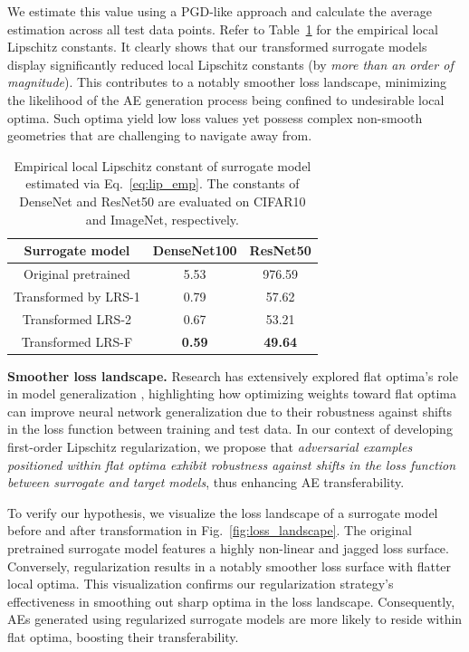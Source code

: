 \documentclass[letterpaper]{article} %
\theoremstyle{plain}
\theoremstyle{definition}
\newcommand{\fref}[1]{Fig.~\ref{#1}}
\newcommand{\tref}[1]{Table~\ref{#1}}
\begin{document}
We estimate this value using a PGD-like approach and calculate the average estimation across all test data points. Refer to \tref{tab:lip_const} for the empirical local Lipschitz constants. It clearly shows that our transformed surrogate models display significantly reduced local Lipschitz constants (by {\em more than an order of magnitude}). This contributes to a notably smoother loss landscape, minimizing the likelihood of the AE generation process being confined to undesirable local optima. Such optima yield low loss values yet possess complex non-smooth geometries that are challenging to navigate away from.

\begin{table}[ht!]
\small
\begin{center}
\begin{tabular}{|c|c|c|}
\hline
Surrogate model & DenseNet100 & ResNet50\\
\hline
Original pretrained  & 5.53 &  976.59\\
Transformed by LRS-1 & 0.79 &  57.62\\
Transformed LRS-2 & 0.67 &  53.21\\
Transformed LRS-F & \textbf{0.59} & \textbf{49.64} \\
\hline
\end{tabular}
\caption{Empirical local Lipschitz constant of surrogate model estimated via Eq.~\eqref{eq:lip_emp}. The constants of DenseNet and ResNet50 are evaluated on CIFAR10 and ImageNet, respectively.}
\label{tab:lip_const}
\vspace{-5mm}
\end{center}
\end{table}


\textbf{Smoother loss landscape.} 
Research has extensively explored flat optima's role in model generalization \cite{chaudhari2019entropy,keskar2017on,foret2020sharpness}, highlighting how optimizing weights toward flat optima can improve neural network generalization due to their robustness against shifts in the loss function between training and test data. In our context of developing first-order Lipschitz regularization, we propose that \emph{adversarial examples positioned within flat optima exhibit robustness against shifts in the loss function between surrogate and target models}, thus enhancing AE transferability.

To verify our hypothesis, we visualize the loss landscape of a surrogate model before and after transformation in \fref{fig:loss_landscape}. The original pretrained surrogate model features a highly non-linear and jagged loss surface. Conversely, regularization results in a notably smoother loss surface with flatter local optima. This visualization confirms our regularization strategy's effectiveness in smoothing out sharp optima in the loss landscape. Consequently, AEs generated using regularized surrogate models are more likely to reside within flat optima, boosting their transferability.
\end{document}
